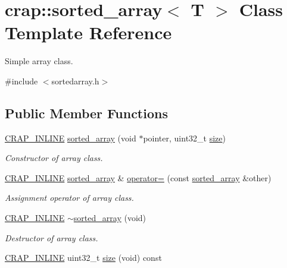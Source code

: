 \hypertarget{classcrap_1_1sorted__array}{}\section{crap\+:\+:sorted\+\_\+array$<$ T $>$ Class Template Reference}
\label{classcrap_1_1sorted__array}


Simple array class.  




{\ttfamily \#include $<$sortedarray.\+h$>$}

\subsection*{Public Member Functions}
\begin{DoxyCompactItemize}
\item 
\hyperlink{config__x86_8h_a5a40526b8d842e7ff731509998bb0f1c}{C\+R\+A\+P\+\_\+\+I\+N\+L\+I\+N\+E} \hyperlink{classcrap_1_1sorted__array_a6807ec6612c2d57f275c29e37ee63e22}{sorted\+\_\+array} (void $\ast$pointer, uint32\+\_\+t \hyperlink{classcrap_1_1sorted__array_a296560cdb46c44a1aef6e06b122c10f5}{size})
\begin{DoxyCompactList}\small\item\em Constructor of array class. \end{DoxyCompactList}\item 
\hyperlink{config__x86_8h_a5a40526b8d842e7ff731509998bb0f1c}{C\+R\+A\+P\+\_\+\+I\+N\+L\+I\+N\+E} \hyperlink{classcrap_1_1sorted__array}{sorted\+\_\+array} \& \hyperlink{classcrap_1_1sorted__array_a5283ecb6e3f0d3515605e5d1f5f1d60b}{operator=} (const \hyperlink{classcrap_1_1sorted__array}{sorted\+\_\+array} \&other)
\begin{DoxyCompactList}\small\item\em Assignment operator of array class. \end{DoxyCompactList}\item 
\hyperlink{config__x86_8h_a5a40526b8d842e7ff731509998bb0f1c}{C\+R\+A\+P\+\_\+\+I\+N\+L\+I\+N\+E} \hyperlink{classcrap_1_1sorted__array_aae64790ce1bb794ad34a6c529a0d4c3a}{$\sim$sorted\+\_\+array} (void)
\begin{DoxyCompactList}\small\item\em Destructor of array class. \end{DoxyCompactList}\item 
\hyperlink{config__x86_8h_a5a40526b8d842e7ff731509998bb0f1c}{C\+R\+A\+P\+\_\+\+I\+N\+L\+I\+N\+E} uint32\+\_\+t \hyperlink{classcrap_1_1sorted__array_a296560cdb46c44a1aef6e06b122c10f5}{size} (void) const 

\end{DoxyCompactItemize}
